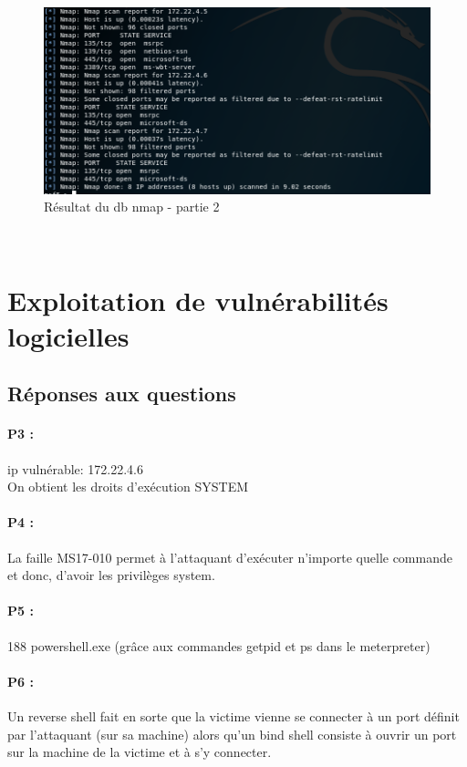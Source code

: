 \documentclass[12pt]{report} %
\begin{document}
\begin{figure}
	\newpage
	\includegraphics[width=17cm]{db_nmap_3_1_b.PNG}
	\caption*{Résultat du db nmap - partie 2}
\end{figure}

\newpage
~
\newpage

\section*{Exploitation de vulnérabilités logicielles}

\subsection*{Réponses aux questions}
\paragraph{P3 :} ip vulnérable: 172.22.4.6\\
On obtient les droits d'exécution SYSTEM
\paragraph{P4 :}  La faille MS17-010 permet à l'attaquant d'exécuter n'importe quelle commande et donc, d'avoir les privilèges system.
\paragraph{P5 :} 188 powershell.exe (grâce aux commandes getpid et ps dans le meterpreter)
\paragraph{P6 :} Un reverse shell fait en sorte que la victime vienne se connecter à un port définit par l'attaquant (sur sa machine) alors qu'un bind shell consiste à ouvrir un port sur la machine de la victime et à s'y connecter.
\end{document}
